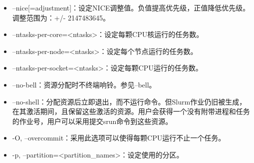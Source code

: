 \begin{itemize}
%
%
%
   \item --nice[=adjustment]：设定NICE调整值。负值提高优先级，正值降低优先级。调整范围为：+/- 2147483645。
   \item --ntasks-per-core=<ntasks>：设定每颗CPU核运行的任务数。
   \item --ntasks-per-node=<ntasks>：设定每个节点运行的任务数。
   \item --ntasks-per-socket=<ntasks>：设定每颗CPU运行的任务数。
   \item --no-bell：资源分配时不终端响铃。参见--bell。
   \item --no-shell：分配资源后立即退出，而不运行命令。但Slurm作业仍旧被生成，在其激活期间，且保留这些激活的资源。用户会获得一个没有附带进程和任务的作业号，用户可以采用提交srun命令到这些资源。
   \item -O, --overcommit：采用此选项可以使得每颗CPU运行不止一个任务。
   \item -p, --partition=<partition\_names>：设定使用的分区。

%
%
%
%
%
%
%


\end{itemize}
